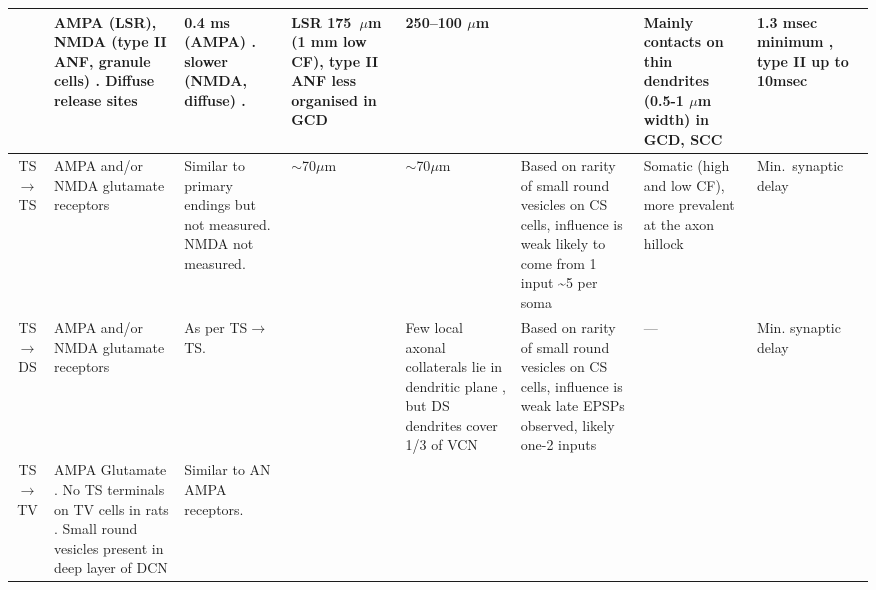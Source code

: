 \begin{longtable}{cYYYYYYY}
& %
AMPA (LSR), NMDA (type II ANF, granule cells)
\citep{Cant:1992,FerragamoGoldingEtAl:1998a,RyugoWrightEtAl:1993,Ryugo:1992,RyugoParks:2003}.
Diffuse release sites \citep{HurdHutsonEtAl:1999}             
& %
0.4 ms (AMPA)   \citep{GardnerTrussellEtAl:1999}. 
slower (NMDA, diffuse) \citep{HurdHutsonEtAl:1999}.    
& %
LSR 175~$\mu$m (1 mm low CF)\citep{Ryugo:2008}, type II ANF less organised in GCD \citep{WeedmanPongstapornEtAl:1996,RyugoWrigthEtAl:1993}
& %
250--100 $\mu$m \citep{FerragamoGoldingEtAl:1998a}                     
&                                            
& %
Mainly contacts on thin dendrites (0.5-1 $\mu$m width) in GCD, SCC 
\citep{BensonBrown:2004,FerragamoGoldingEtAl:1998}                
& %
1.3 msec minimum \citep{FerragamoGoldingEtAl:1998a}, 
type II up to 10msec \citep[theoretical][]{Brown:1993}
\\ \midrule
TS\ensuremath{\rightarrow}TS                        
& %
AMPA and/or NMDA glutamate receptors \citep{FerragamoGoldingEtAl:1998a}        
& %
Similar to primary endings but not measured.  
NMDA not measured.           
&
$\sim$70$\mu$m \citep[cat][]{SmithRhode:1989} 
& %
$\sim$70$\mu$m \citep[cat][]{SmithRhode:1989} 
& %
Based on rarity of small round vesicles on CS cells, influence is weak \citep{SmithRhode:1989} 
likely to come from 1 input \citep{FerragamoGoldingEtAl:1998a}                     
\~{}5 per soma  \citep[chinchilla][]{JosephsonMorest:1998}
& %
Somatic (high and low CF), more prevalent at the axon hillock   \citep[chinchilla][]{JosephsonMorest:1998}
& %
Min.\ synaptic delay 
\\ \midrule
TS\ensuremath{\rightarrow}DS                        
& %
AMPA and/or NMDA glutamate receptors \citep{FerragamoGoldingEtAl:1998a}  
& As per TS\ensuremath{\rightarrow}TS.
& %
& %
Few local axonal collaterals lie in dendritic plane \citep{SmithRhode:1989}, but DS dendrites cover 1/3 of VCN
& 
Based on rarity of small round vesicles on CS cells, influence is weak \citep{SmithRhode:1989} late EPSPs observed,
likely one-2 inputs \citep{FerragamoGoldingEtAl:1998a, OertelWuEtAl:1990} 
& ---                                     
& Min. synaptic delay \\ \midrule
TS\ensuremath{\rightarrow}TV                        
& %
AMPA Glutamate \citep{DoucetRossEtAl:1999,FerragamoGoldingEtAl:1998a,ZhangOertel:1993}.
No TS terminals on TV cells in rats \citep[rat][]{RubioJuiz:2004}.
Small round vesicles present in deep layer of DCN \citep[guinea pig][]{Alibardi:1999}
& 
Similar to AN AMPA receptors.        
& %
& %


\end{longtable}

